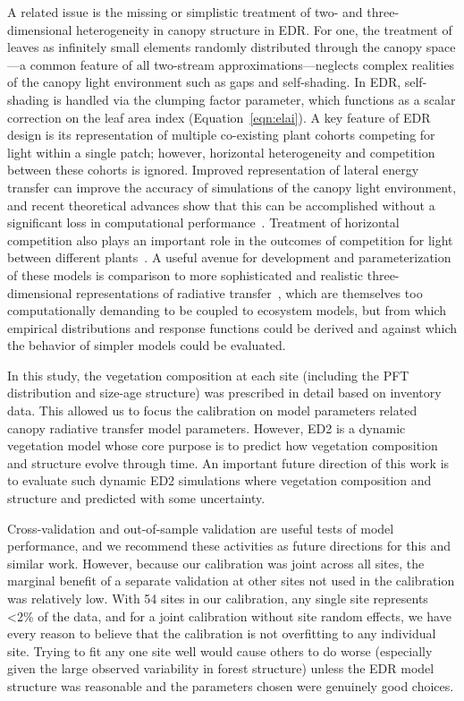 A related issue is the missing or simplistic treatment of two- and three-dimensional heterogeneity in canopy structure in EDR.\@
For one, the treatment of leaves as infinitely small elements randomly distributed through the canopy space---a common feature of all two-stream approximations---neglects complex realities of the canopy light environment such as gaps and self-shading.
In EDR, self-shading is handled via the clumping factor parameter, which functions as a scalar correction on the leaf area index (Equation~\ref{eqn:elai}).
A key feature of EDR design is its representation of multiple co-existing plant cohorts competing for light within a single patch;
however, horizontal heterogeneity and competition between these cohorts is ignored.
Improved representation of lateral energy transfer can improve the accuracy of simulations of the canopy light environment, and recent theoretical advances show that this can be accomplished without a significant loss in computational performance~\citep{hogan_2018_fast}.
Treatment of horizontal competition also plays an important role in the outcomes of competition for light between different plants~\citep{fisher2018vegetation}.
A useful avenue for development and parameterization of these models is comparison to more sophisticated and realistic three-dimensional representations of radiative transfer~\citep[e.g.][]{widlowski2007third}, which are themselves too computationally demanding to be coupled to ecosystem models, but from which empirical distributions and response functions could be derived and against which the behavior of simpler models could be evaluated.

In this study, the vegetation composition at each site (including the PFT distribution and size-age structure) was prescribed in detail based on inventory data.
This allowed us to focus the calibration on model parameters related canopy radiative transfer model parameters.
However, ED2 is a dynamic vegetation model whose core purpose is to predict how vegetation composition and structure evolve through time.
An important future direction of this work is to evaluate such dynamic ED2 simulations where vegetation composition and structure and predicted with some uncertainty.

Cross-validation and out-of-sample validation are useful tests of model performance, and we recommend these activities as future directions for this and similar work.
However, because our calibration was joint across all sites, the marginal benefit of a separate validation at other sites not used in the calibration was relatively low.
With 54 sites in our calibration, any single site represents <2\% of the data, and for a joint calibration without site random effects, we have every reason to believe that the calibration is not overfitting to any individual site.
Trying to fit any one site well would cause others to do worse (especially given the large observed variability in forest structure) unless the EDR model structure was reasonable and the parameters chosen were genuinely good choices.

